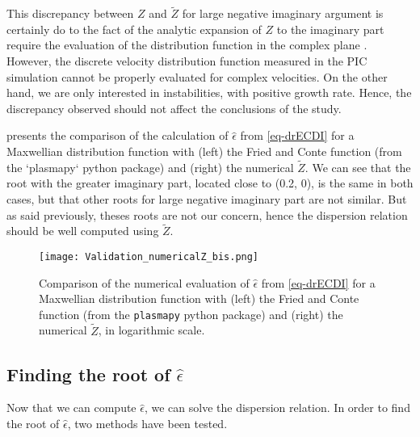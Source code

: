   This discrepancy between $Z$ and $\tilde{Z}$ for large negative imaginary argument is certainly do to the fact of the analytic expansion of $Z$ to the imaginary part require the evaluation of the distribution function in the complex plane \citet{xiehua-sheng2013,weideman1995}.
  However, the discrete velocity distribution function measured in the \ac{PIC} simulation cannot be properly evaluated for complex velocities.
  On the other hand, we are only interested in instabilities, with positive growth rate.
  Hence, the discrepancy observed should not affect the conclusions of the study.
  
   presents the comparison of the calculation of $\hat\epsilon$ from \cref{eq-drECDI} for a Maxwellian distribution function with (left) the Fried and Conte function (from the `plasmapy` python package) and (right) the numerical $\tilde{Z}$.
  We can see that the root with the greater imaginary part, located close to (0.2, 0), is the same in both cases, but that other roots for large negative imaginary part are not similar.
  But as said previously, theses roots are not our concern, hence the dispersion relation should be well computed using $\tilde{Z}$.
  

  \begin{figure}[hbtp]
    \centering
    \texttt{[image: Validation\_numericalZ\_bis.png]}
    \caption{Comparison of the numerical evaluation of $\hat\epsilon$ from \cref{eq-drECDI} for a Maxwellian distribution function with (left) the Fried and Conte function (from the \texttt{plasmapy} python package) and (right) the numerical $\tilde{Z}$, in logarithmic scale.  }
    \label{fig-numZbis}
  \end{figure}
  
  \subsection{Finding the root of $\hat\epsilon$}
  Now that we can compute $\hat\epsilon$, we can solve the dispersion relation.
  In order to find the root of $\hat\epsilon$, two methods have been tested.
  
  
